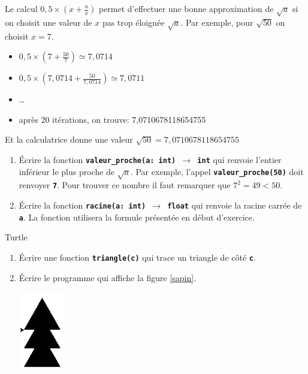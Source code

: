 \documentclass[a4paper,11pt]{article}
\begin{document}
\begin{exo}
    Le calcul $0,5×(x+\frac{a}{x})$ permet d'effectuer une bonne approximation de $\sqrt{a}$ si on choisit une valeur de $x$ pas trop éloignée $\sqrt{a}$. Par exemple, pour $\sqrt{50}$ on choisit $x=7$.
    \begin{itemize}
        \item $0,5×(7+\frac{50}{7})\simeq 7,0714$
        \item $0,5×(7,0714+\frac{50}{7,0714})\simeq 7,0711$
        \item \dots
        \item après 20 itérations, on trouve: 7,0710678118654755
    \end{itemize}
    Et la calculatrice donne une valeur $\sqrt{50}=7,0710678118654755$
    \begin{enumerate}
        \item Écrire la fonction \textbf{\texttt{valeur\_proche(a: int) $\rightarrow$ int}} qui renvoie l'entier inférieur le plus proche de $\sqrt{a}$. Par exemple, l'appel \textbf{\texttt{valeur\_proche(50)}} doit renvoyer \textbf{\texttt{7}}. Pour trouver ce nombre il faut remarquer que $7^2 = 49 < 50$.
        \item Écrire la fonction \textbf{\texttt{racine(a: int) $\rightarrow$ float}} qui renvoie la racine carrée de \textbf{\texttt{a}}. La fonction utilisera la formule présentée en début d'exercice.
    \end{enumerate}
\end{exo}
\begin{exo}
    Turtle
    \begin{enumerate}
        \item Écrire une fonction \texttt{\textbf{triangle(c)}} qui trace un triangle de côté \textbf{\texttt{c}}.
        \item Écrire le programme qui affiche la figure \ref{sapin}.
              \begin{center}
                  \centering
                  \includegraphics[width=2cm]{ressources/sapin.png}
                  \label{sapin}
              \end{center}
    \end{enumerate}
\end{exo}
\end{document}
